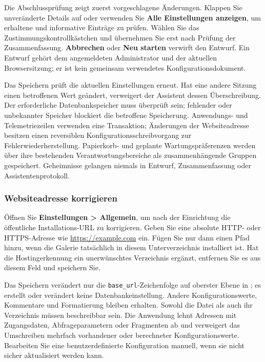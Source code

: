 \documentclass[11pt,a4paper]{article}
\newcommand{\filepath}[1]{\path{#1}}
\newcommand{\ui}[1]{\textbf{#1}}
\newcommand{\codeword}[1]{\nolinkurl{#1}}
\begin{document}
Die Abschlussprüfung zeigt zuerst vorgeschlagene Änderungen. Klappen Sie
unveränderte Details auf oder verwenden Sie \ui{Alle Einstellungen anzeigen}, um
erhaltene und informative Einträge zu prüfen. Wählen Sie das
Zustimmungskontrollkästchen und übernehmen Sie erst nach Prüfung der
Zusammenfassung. \ui{Abbrechen} oder \ui{Neu starten} verwirft den Entwurf. Ein
Entwurf gehört dem angemeldeten Administrator und der aktuellen Browsersitzung;
er ist kein gemeinsam verwendetes Konfigurationsdokument.

Das Speichern prüft die aktuellen Einstellungen erneut. Hat eine andere Sitzung
einen betroffenen Wert geändert, verweigert der Assistent dessen Überschreibung.
Der erforderliche Datenbankspeicher muss überprüft sein; fehlender oder
unbekannter Speicher blockiert die betroffene Speicherung. Anwendungs- und
Telemetriezeilen verwenden eine Transaktion; Änderungen der Websiteadresse
besitzen einen reversiblen Konfigurationsschreibvorgang zur
Fehlerwiederherstellung. Papierkorb- und geplante Wartungspräferenzen werden
über ihre bestehenden Verantwortungsbereiche als zusammenhängende Gruppen
gespeichert. Geheimnisse gelangen niemals in Entwurf, Zusammenfassung oder
Assistentenprotokoll.

\subsubsection{Websiteadresse korrigieren}

Öffnen Sie \ui{Einstellungen > Allgemein}, um nach der Einrichtung die
öffentliche Installations-URL zu korrigieren. Geben Sie eine absolute HTTP- oder
HTTPS-Adresse wie \url{https://example.com} ein. Fügen Sie nur dann einen Pfad
hinzu, wenn die Galerie tatsächlich in diesem Unterverzeichnis installiert ist.
Hat die Hostingerkennung ein unerwünschtes Verzeichnis ergänzt, entfernen Sie es
aus diesem Feld und speichern Sie.

Das Speichern verändert nur die \codeword{base_url}-Zeichenfolge auf oberster
Ebene in \filepath{config.php}; es erstellt oder verändert keine
Datenbankeinstellung. Andere Konfigurationswerte, Kommentare und Formatierung
bleiben erhalten. Sowohl die Datei als auch ihr Verzeichnis müssen beschreibbar
sein. Die Anwendung lehnt Adressen mit Zugangsdaten, Abfrageparametern oder
Fragmenten ab und verweigert das Umschreiben mehrfach vorhandener oder
berechneter Konfigurationswerte. Bearbeiten Sie eine benutzerdefinierte
Konfiguration manuell, wenn sie nicht sicher aktualisiert werden kann.
\end{document}
